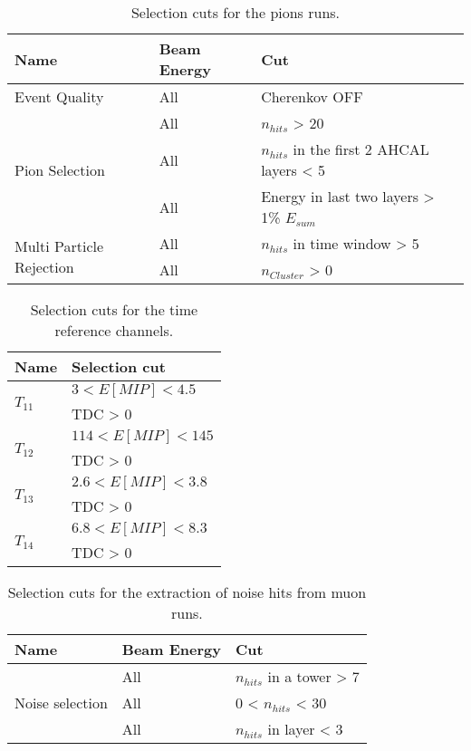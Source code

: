 \begin{table}[htb!]
	\centering
	\caption{Selection cuts for the pions runs.}
	\label{table:pion_sel}
	\begin{tabular}{@{}lll@{}}
		\toprule
		\multicolumn{1}{l}{\textbf{Name}} & \textbf{Beam Energy} & \textbf{Cut}\\
		\midrule
		\multirow{1}{*}{Event Quality}& All & Cherenkov OFF\\
		\multirow{3}{*}{Pion Selection}& All & $n_{hits}$ > 20 \\& All & $n_{hits}$ in the first 2 AHCAL layers < 5 \\& All & Energy in last two layers > 1\% $E_{sum}$ \\
		\multirow{2}{*}{Multi Particle Rejection}& All & $n_{hits}$ in time window > 5 \\& All & $n_{Cluster}$ > 0 \\
		\bottomrule
	\end{tabular}
\end{table}

\begin{table}[htb!]
	\centering
	\caption{Selection cuts for the time reference channels.}
	\label{table:T0_sel}
	\begin{tabular}{@{}ll@{}}
		\toprule
		\multicolumn{1}{l}{\textbf{Name}} & \textbf{Selection cut}\\
		\midrule
		\multirow{2}{*}{$T_{11}$}& $3 < E [MIP] < 4.5$\\ & TDC > 0 \\
		\multirow{2}{*}{$T_{12}$}& $114 < E [MIP] < 145$\\ & TDC > 0 \\
		\multirow{2}{*}{$T_{13}$}& $2.6 < E [MIP] < 3.8$\\ & TDC > 0 \\
		\multirow{2}{*}{$T_{14}$}& $6.8 < E [MIP] < 8.3$\\ & TDC > 0 \\
		\bottomrule
	\end{tabular}
\end{table}

\begin{table}[htb!]
	\centering
	\caption{Selection cuts for the extraction of noise hits from muon runs.}
	\label{table:noise_sel}
	\begin{tabular}{@{} lll @{}}
		\toprule
		\multicolumn{1}{l}{\textbf{Name}} & \textbf{Beam Energy} & \textbf{Cut}\\
		\midrule
		\multirow{3}{*}{Noise selection}& All & $n_{hits}$ in a tower > 7\\& All & 0 < $n_{hits}$ < 30\\& All & $n_{hits}$ in layer < 3\\
		\bottomrule
	\end{tabular}
\end{table}
